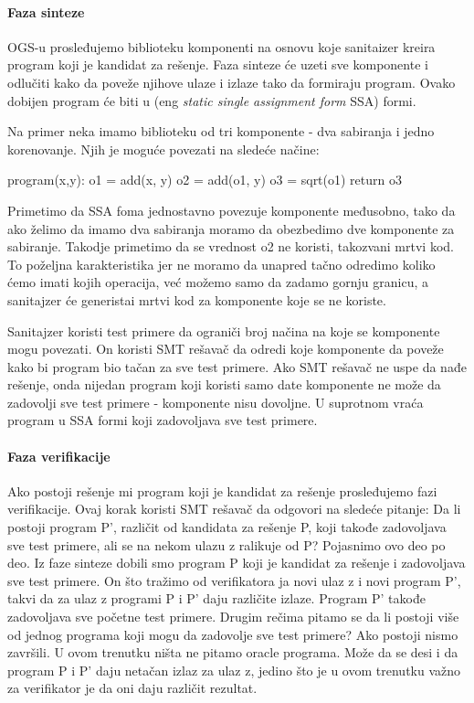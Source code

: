 \paragraph{Faza sinteze}

 OGS-u prosleđujemo biblioteku komponenti na osnovu koje sanitaizer kreira program koji je kandidat za rešenje. Faza sinteze će uzeti sve komponente i odlučiti kako da poveže njihove ulaze i izlaze tako da formiraju program. Ovako dobijen program će biti u (eng \emph{static single assignment form} SSA) formi.
 
 Na primer neka imamo biblioteku od tri komponente - dva sabiranja i jedno korenovanje. Njih je moguće povezati na sledeće načine:

program(x,y):
	o1 = add(x, y)
	o2 = add(o1, y)
	o3 = sqrt(o1)
	return o3

 
 Primetimo da SSA foma jednostavno povezuje komponente međusobno, tako da ako želimo da imamo dva sabiranja moramo da obezbedimo dve komponente za sabiranje. Takodje primetimo da se vrednost o2 ne koristi, takozvani mrtvi kod. To poželjna karakteristika jer ne moramo da unapred tačno odredimo koliko ćemo imati kojih operacija, već možemo samo da zadamo gornju granicu, a sanitajzer će generistai mrtvi kod za komponente koje se ne koriste.
 
 Sanitajzer koristi test primere da ograniči broj načina na koje se komponente mogu povezati. On koristi SMT rešavač da odredi koje komponente da poveže kako bi program bio tačan za sve test primere. Ako SMT rešavač ne uspe da nađe rešenje, onda nijedan program koji koristi samo date komponente ne može da zadovolji sve test primere - komponente nisu dovoljne. U suprotnom vraća program u SSA formi koji zadovoljava sve test primere.
 
 \paragraph{Faza verifikacije}

Ako postoji rešenje mi program koji je kandidat za rešenje prosleđujemo fazi verifikacije. Ovaj korak koristi SMT rešavač da odgovori na sledeće pitanje: Da li postoji program P', različit od kandidata za rešenje P, koji takođe zadovoljava sve test primere, ali se na nekom ulazu z ralikuje od P?
Pojasnimo ovo deo po deo. Iz faze sinteze dobili smo program P koji je kandidat za rešenje i zadovoljava sve test primere. On što tražimo od verifikatora ja novi ulaz z i novi program P', takvi da za ulaz z programi P i P' daju različite izlaze. Program P' takođe zadovoljava sve početne test primere.
Drugim rečima pitamo se da li postoji više od jednog programa koji mogu da zadovolje sve test primere? Ako postoji nismo završili.
U ovom trenutku ništa ne pitamo oracle programa. Može da se desi i da program P i P' daju netačan izlaz za ulaz z, jedino što je u ovom trenutku važno za verifikator je da oni daju različit rezultat.


